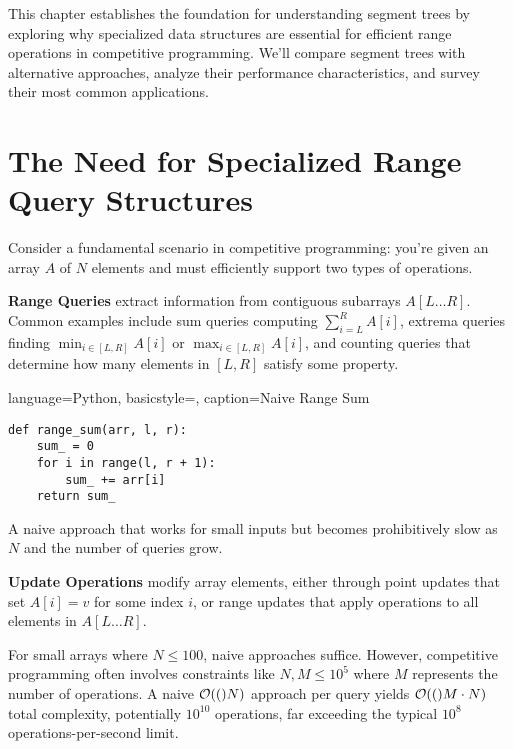 \label{chap:introduction}

This chapter establishes the foundation for understanding segment trees by exploring why specialized data structures are essential for efficient range operations in competitive programming. We'll compare segment trees with alternative approaches, analyze their performance characteristics, and survey their most common applications.

\section{The Need for Specialized Range Query Structures}
\label{sec:why_special_structures}

Consider a fundamental scenario in competitive programming: you're given an array $A$ of $N$ elements and must efficiently support two types of operations.

\textbf{Range Queries} extract information from contiguous subarrays $A[L \ldots R]$. Common examples include sum queries computing $\sum_{i=L}^{R} A[i]$, extrema queries finding $\min_{i \in [L,R]} A[i]$ or $\max_{i \in [L,R]} A[i]$, and counting queries that determine how many elements in $[L,R]$ satisfy some property.

\begin{marginlisting}[0pt]{language=Python, basicstyle=\ttfamily\scriptsize, caption=Naive Range Sum}
\begin{lstlisting}
def range_sum(arr, l, r):
    sum_ = 0
    for i in range(l, r + 1):
        sum_ += arr[i]
    return sum_
\end{lstlisting}
A naive approach that works for small inputs but becomes prohibitively slow as $N$ and the number of queries grow.
\end{marginlisting}

\textbf{Update Operations} modify array elements, either through point updates that set $A[i] = v$ for some index $i$, or range updates that apply operations to all elements in $A[L \ldots R]$.

For small arrays where $N \leq 100$, naive approaches suffice. However, competitive programming often involves constraints like $N, M \leq 10^5$ where $M$ represents the number of operations. A naive $\mathcal{O}(()N)$ approach per query yields $\mathcal{O}(()M \cdot N)$ total complexity, potentially $10^{10}$ operations, far exceeding the typical $10^8$ operations-per-second limit.

